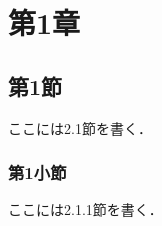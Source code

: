 \section{第1章}
\label{sec:1}
\subsection{第1節}

ここには2.1節を書く．

\lipsum[3-4]

\subsubsection{第1小節}

ここには2.1.1節を書く．

\lipsum[5-6]
